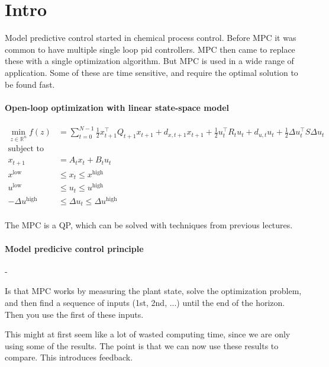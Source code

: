 \documentclass{article}
\begin{document}
\maketitle

\section{Intro}

Model predictive control started in chemical process control. Before MPC it was common to have multiple single loop
pid controllers. MPC then came to replace these with a single optimization algorithm. But MPC is used in a wide range of 
application. Some of these are time sensitive, and require the optimal solution to be found fast. 

\paragraph{Open-loop optimization with linear state-space model}

\begin{align*}
  \min_{z\in \mathbb{R}^{n}} f(z) &= \sum_{t=0}^{N-1} \frac{1}{2} x_{t+1}^{\top}Q_{t+1}x_{t+1} + d_{x,t+1}x_{t+1} + \frac{1}{2}u_t^{\top}R_t u_t + d_{u,t}u_t + \frac{1}{2} \Delta u_t^{\top}S \Delta u_t \\ 
  \text{subject to}& \\ 
  x_{t+1} &= A_t x_t + B_t u_t  \\ 
  x^{\text{low}} &\leq x_t \leq x^{\text{high}} \\ 
  u^{\text{low}} & \leq u_t \leq u^{\text{high}} \\ 
  -\Delta u^{\text{high}} & \leq \Delta u_t \leq \Delta u^{\text{high}}  \\ 
\end{align*}

The MPC is a QP, which can be solved with techniques from previous lectures. 

\paragraph{Model predicive control principle}- 

\medskip Is that MPC works by measuring the plant state, solve the optimization problem, and then find a sequence of inputs (1st, 2nd, ...) until the end 
of the horizon. Then you use the first of these inputs. 

This might at first seem like a lot of wasted computing time, since we are only using some of the results. The point is that we can now use these results to compare. This introduces feedback. 
\end{document}
